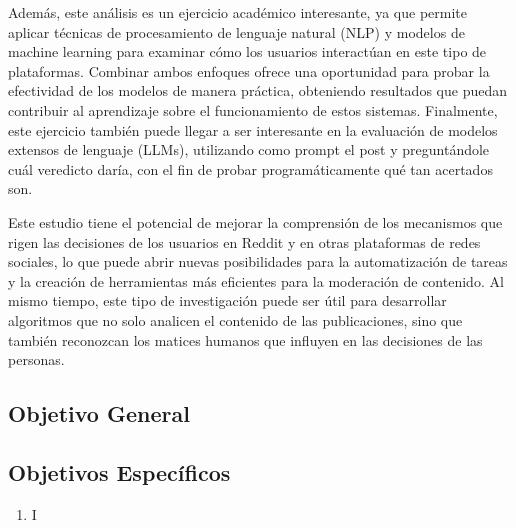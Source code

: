 Además, este análisis es un ejercicio académico interesante, ya que permite aplicar técnicas de procesamiento de lenguaje natural (NLP) y modelos de machine learning para examinar cómo los usuarios interactúan en este tipo de plataformas. Combinar ambos enfoques ofrece una oportunidad para probar la efectividad de los modelos de manera práctica, obteniendo resultados que puedan contribuir al aprendizaje sobre el funcionamiento de estos sistemas. Finalmente, este ejercicio también puede llegar a ser interesante en la evaluación de modelos extensos de lenguaje (LLMs), utilizando como prompt el post y preguntándole cuál veredicto daría, con el fin de probar programáticamente qué tan acertados son.

Este estudio tiene el potencial de mejorar la comprensión de los mecanismos que rigen las decisiones de los usuarios en Reddit y en otras plataformas de redes sociales, lo que puede abrir nuevas posibilidades para la automatización de tareas y la creación de herramientas más eficientes para la moderación de contenido. Al mismo tiempo, este tipo de investigación puede ser útil para desarrollar algoritmos que no solo analicen el contenido de las publicaciones, sino que también reconozcan los matices humanos que influyen en las decisiones de las personas.


\subsection{Objetivo General}



\subsection{Objetivos Específicos}

\begin{enumerate}
    \item I
\end{enumerate}